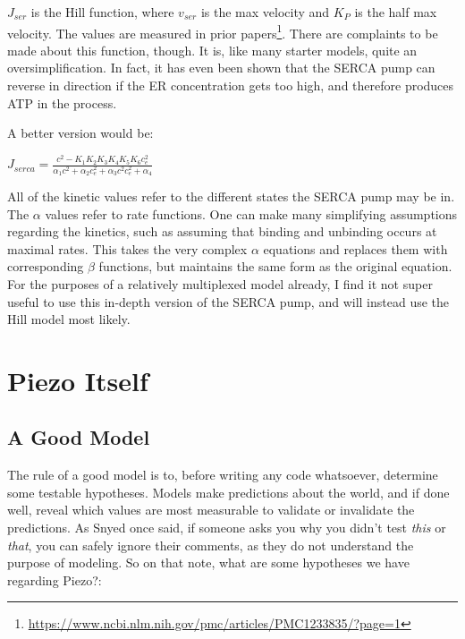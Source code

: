 \documentclass[12pt]{amsart}
\begin{document}
\bigskip

 $J_{ser}$ is the Hill function, where $v_{ser}$ is the max velocity and $K_P$ is the half max velocity. The values are measured in prior papers\footnote{\url{https://www.ncbi.nlm.nih.gov/pmc/articles/PMC1233835/?page=1}}. There are complaints to be made about this function, though. It is, like many starter models, quite an oversimplification. In fact, it has even been shown that the SERCA pump can reverse in direction if the ER concentration gets too high, and therefore produces ATP in the process. \newline

 A better version would be: 

 \bigskip

 \begin{center}

    $J_{serca} = \frac{c^2 - K_1K_2K_3K_4K_5K_6c_e^2}{\alpha_1c^2 + \alpha_2c_e^2 + \alpha_3c^2c^2_e + \alpha_4}$
     
 \end{center}

 \bigskip

 All of the kinetic values refer to the different states the SERCA pump may be in. The $\alpha$ values refer to rate functions. One can make many simplifying assumptions regarding the kinetics, such as assuming that binding and unbinding occurs at maximal rates. This takes the very complex $\alpha$ equations and replaces them with corresponding $\beta$ functions, but maintains the same form as the original equation. For the purposes of a relatively multiplexed model already, I find it not super useful to use this in-depth version of the SERCA pump, and will instead use the Hill model most likely.

 \section{Piezo Itself}

 \subsection{A Good Model} The rule of a good model is to, before writing any code whatsoever, determine some testable hypotheses. Models make predictions about the world, and if done well, reveal which values are most measurable to validate or invalidate the predictions. As Snyed once said, if someone asks you why you didn't test \textit{this} or \textit{that}, you can safely ignore their comments, as they do not understand the purpose of modeling. So on that note, what are some hypotheses we have regarding Piezo?:\newline
\end{document}
